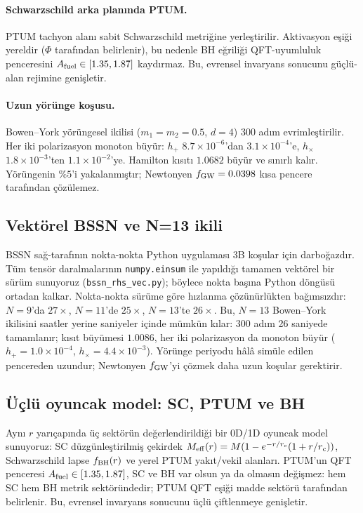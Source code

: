 \paragraph{Schwarzschild arka planında PTUM.}
PTUM tachyon alanı sabit Schwarzschild metriğine yerleştirilir.
Aktivasyon eşiği yereldir ($\Phi$ tarafından belirlenir), bu
nedenle BH eğriliği QFT-uyumluluk penceresini
$A_{\rm fuel} \in [1.35, 1.87]$ kaydırmaz. Bu, evrensel invaryans
sonucunu güçlü-alan rejimine genişletir.
\paragraph{Uzun yörünge koşusu.}
Bowen--York yörüngesel ikilisi ($m_1 = m_2 = 0.5$, $d = 4$)
300 adım evrimleştirilir. Her iki polarizasyon monoton büyür:
$h_+$ $8.7\times 10^{-6}$'dan $3.1\times 10^{-4}$'e, $h_\times$
$1.8\times 10^{-3}$'ten $1.1\times 10^{-2}$'ye. Hamilton kısıtı
$1.0682$ büyür ve sınırlı kalır. Yörüngenin $\%5$'i yakalanmıştır;
Newtonyen $f_{\rm GW} = 0.0398$ kısa pencere tarafından
çözülemez.

\subsection{Vektörel BSSN ve N=13 ikili}
BSSN sağ-tarafının nokta-nokta Python uygulaması 3B koşular için
darboğazdır. Tüm tensör daralmalarının \texttt{numpy.einsum} ile
yapıldığı tamamen vektörel bir sürüm sunuyoruz
(\texttt{bssn\_rhs\_vec.py}); böylece nokta başına Python döngüsü
ortadan kalkar. Nokta-nokta sürüme göre hızlanma çözünürlükten
bağımsızdır: $N=9$'da $27\times$, $N=11$'de $25\times$, $N=13$'te
$26\times$. Bu, $N=13$ Bowen--York ikilisini saatler yerine saniyeler
içinde mümkün kılar: 300 adım 26 saniyede tamamlanır; kısıt büyümesi
$1.0086$, her iki polarizasyon da monoton büyür ($h_+ = 1.0\times
10^{-4}$, $h_\times = 4.4\times 10^{-3}$). Yörünge periyodu hâlâ
simüle edilen pencereden uzundur; Newtonyen $f_{\rm GW}$'yi çözmek
daha uzun koşular gerektirir.

\subsection{Üçlü oyuncak model: SC, PTUM ve BH}
Aynı $r$ yarıçapında üç sektörün değerlendirildiği bir 0D/1D
oyuncak model sunuyoruz: SC düzgünleştirilmiş çekirdek
$M_{\rm eff}(r) = M(1 - e^{-r/r_c}(1 + r/r_c))$, Schwarzschild
lapse $f_{\rm BH}(r)$ ve yerel PTUM yakıt/vekil alanları. PTUM'un
QFT penceresi $A_{\rm fuel} \in [1.35, 1.87]$, SC ve BH var olsun
ya da olmasın değişmez: hem SC hem BH metrik sektöründedir;
PTUM QFT eşiği madde sektörü tarafından belirlenir. Bu, evrensel
invaryans sonucunu üçlü çiftlenmeye genişletir.

